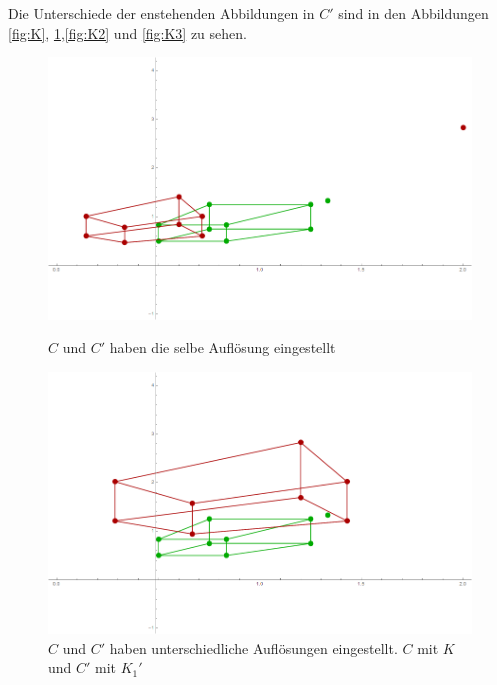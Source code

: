 Die Unterschiede der enstehenden Abbildungen in $C'$ sind in den Abbildungen \ref{fig:K}, \ref{fig:K1},\ref{fig:K2} und \ref{fig:K3} zu sehen. \\
 
 
\begin{figure}[!htb]
	\includegraphics[width=\linewidth]{images/Zeta1.png}
	\caption{$C$ und $C'$ haben die selbe Auflösung eingestellt}
	\label{fig:K}
	\endminipage\hfill
	\includegraphics[width=\linewidth]{images/Zeta2.png}
	\caption{$C$ und $C'$ haben unterschiedliche Auflösungen eingestellt. $C$ mit $K$ und $C'$ mit $K_1'$}
	\label{fig:K1}
	\endminipage\hfill
\end{figure}

